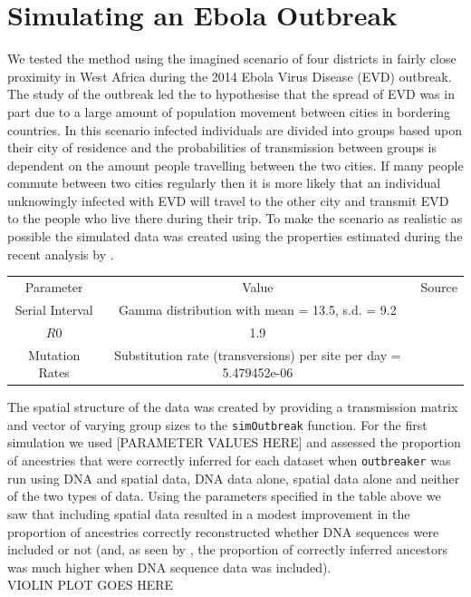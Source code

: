 \documentclass[11pt,a4paper]{report}
\begin{document}
\section{Simulating an Ebola Outbreak}
We tested the method using the imagined scenario of four districts in fairly close proximity in West Africa during the 2014 Ebola Virus Disease (EVD) outbreak. The study of the outbreak led the \citet{Ebola14} to hypothesise that the spread of EVD was in part due to a large amount of population movement between cities in bordering countries. In this scenario infected individuals are divided into groups based upon their city of residence and the probabilities of transmission between groups is dependent on the amount people travelling between the two cities. If many people commute between two cities regularly then it is more likely that an individual unknowingly infected with EVD will travel to the other city and transmit EVD to the people who live there during their trip. To make the scenario as realistic as possible the simulated data was created using the properties estimated during the recent analysis by \citet{Ebola14}.

\begin{tabular}{| c | c | c |}
Parameter & Value & Source \\
Serial Interval & Gamma distribution with mean = 13.5, s.d. = 9.2 & \citet{Ebola14} \\
$R0$ & 1.9 & \citet{Ebola14} \\
Mutation Rates & Substitution rate (transversions) per site per day =  5.479452e-06 & \citet{Gire14} \\

\end{tabular}

The spatial structure of the data was created by providing a transmission matrix and vector of varying group sizes to the {\tt simOutbreak} function. For the first simulation we used [PARAMETER VALUES HERE] and assessed the proportion of ancestries that were correctly inferred for each dataset when {\tt outbreaker} was run using DNA and spatial data, DNA data alone, spatial data alone and neither of the two types of data. Using the parameters specified in the table above we saw that including spatial data resulted in a modest improvement in the proportion of ancestries correctly reconstructed whether DNA sequences were included or not (and, as seen by \citet{outbrkr}, the proportion of correctly inferred ancestors was much higher when DNA sequence data was included).
\\
VIOLIN PLOT GOES HERE
\\
\end{document}
